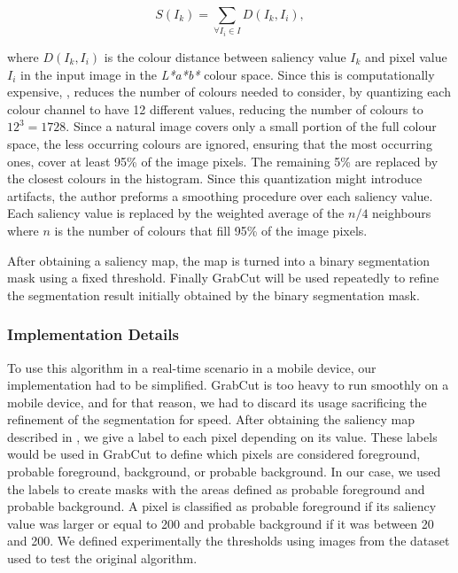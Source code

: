 \begin{equation}
S(I_{k}) = \sum_{\forall I_{i} \in I} D(I_{k}, I_{i}),
\end{equation}

where $D(I_{k}, I_{i})$ is the colour distance between saliency value $I_{k}$ and pixel value $I_{i}$ in the input image in the \emph{L*a*b*} colour space. Since this is computationally expensive, \citeauthor{cheng2011global}, reduces the number of colours needed to consider, by quantizing each colour channel to have 12 different values, reducing the number of colours to $12^{3} = 1728$. Since a natural image covers only a small portion of the full colour space, the less occurring colours are ignored, ensuring that the most occurring ones, cover at least 95\% of the image pixels. The remaining 5\% are replaced by the closest colours in the histogram. Since this quantization might introduce artifacts, the author preforms a smoothing procedure over each saliency value. Each saliency value is replaced by the weighted average of the $n/4$ neighbours where $n$ is the number of colours that fill 95\% of the image pixels.

After obtaining a saliency map, the map is turned into a binary segmentation mask using a fixed threshold. Finally GrabCut \cite{rother2004grabcut} will be used repeatedly to refine the segmentation result initially obtained by the binary segmentation mask.

\subsubsection{Implementation Details}

To use this algorithm in a real-time scenario in a mobile device, our implementation had to be simplified. GrabCut is too heavy to run smoothly on a mobile device, and for that reason, we had to discard its usage sacrificing the refinement of the segmentation for speed. After obtaining the saliency map described in \cite{cheng2011global}, we give a label to each pixel depending on its value. These labels would be used in GrabCut to define which pixels are considered foreground, probable foreground, background, or probable background. In our case, we used the labels to create masks with the areas defined as probable foreground and probable background. A pixel is classified as probable foreground if its saliency value was larger or equal to 200 and probable background if it was between 20 and 200. We defined experimentally the thresholds using images from the dataset used to test the original algorithm.

